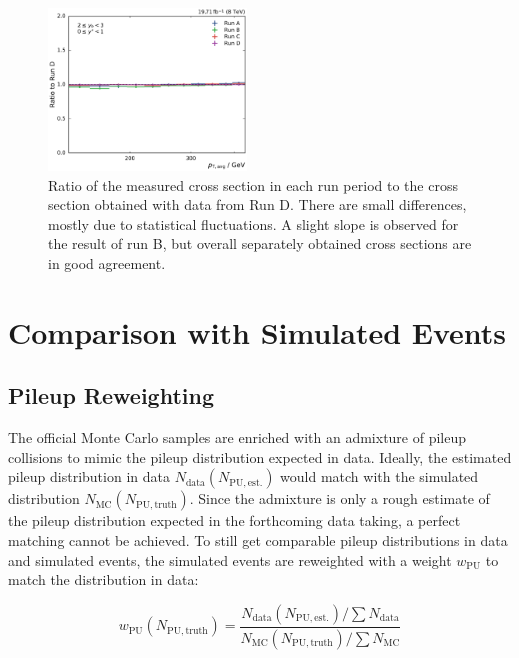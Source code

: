 \begin{figure}[htbp]
    \includegraphics[width=0.47\textwidth]{figures/measurement/run_comparison_yb2ys0.pdf}
    \caption[Stability of result over all run periods]{Ratio of the measured
    cross section in each run period to the cross section obtained with data
    from Run D. There are small differences, mostly due to statistical fluctuations.
    A slight slope is observed for the result of run B, but overall separately
    obtained cross sections are in good agreement.}
    \label{fig:run_comparison}
\end{figure}

\section{Comparison with Simulated Events}
\label{sec:simulated_events}

\subsection{Pileup Reweighting}

The official Monte Carlo samples are enriched with an admixture of pileup
collisions to mimic the pileup distribution expected in data. Ideally, the
estimated pileup distribution in data $N_\mathrm{data} (N_\mathrm{PU, est.})$
would match with the simulated distribution $N_\mathrm{MC} (N_\mathrm{PU,
truth})$. Since the admixture is only a rough estimate of the pileup
distribution expected in the forthcoming data taking, a perfect matching cannot
be achieved. To still get comparable pileup distributions in data and simulated
events, the simulated events are reweighted with a weight $w_\mathrm{PU}$ to
match the distribution in data: 

\begin{equation*}
    w_{\mathrm{PU}} (N_{\mathrm{PU, truth}}) = \frac{N_\mathrm{data}
    (N_\mathrm{PU, est.}) / \sum N_\mathrm{data}}{N_\mathrm{MC}
    (N_\mathrm{PU, truth}) / \sum N_\mathrm{MC}}
\end{equation*}

